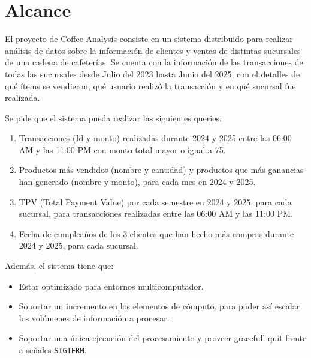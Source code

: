 \section{Alcance}
El proyecto de Coffee Analysis consiste en un sistema distribuido para realizar análisis de datos sobre la información de clientes y ventas de distintas sucursales de una cadena de cafeterías. Se cuenta con la información de las transacciones de todas las sucursales desde Julio del 2023 hasta Junio del 2025, con el detalles de qué ítems se vendieron, qué usuario realizó la transacción y en qué sucursal fue realizada.

Se pide que el sistema pueda realizar las siguientes queries:
\begin{enumerate}
    \item Transacciones (Id y monto) realizadas durante 2024 y 2025 entre las 06:00 AM y las 11:00 PM con monto total mayor o igual a 75.
    \item Productos más vendidos (nombre y cantidad) y productos que más ganancias han generado (nombre y monto), para cada mes en 2024 y 2025.
    \item TPV (Total Payment Value) por cada semestre en 2024 y 2025, para cada sucursal, para transacciones realizadas entre las 06:00 AM y las 11:00 PM.
    \item Fecha de cumpleaños de los 3 clientes que han hecho más compras durante 2024 y 2025, para cada sucursal.
\end{enumerate}

Además, el sistema tiene que:
\begin{itemize}
    \item Estar optimizado para entornos multicomputador.
    \item Soportar un incremento en los elementos de cómputo, para poder así escalar los volúmenes de información a procesar.
    \item Soportar una única ejecución del procesamiento y proveer gracefull quit frente a señales \texttt{SIGTERM}.
\end{itemize}
